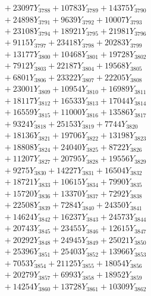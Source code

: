 \documentclass[a4paper,10pt]{article}
\begin{document}
{\begin{align}
&\;  + 23097 Y_{3788} + 10783 Y_{3789} + 14375 Y_{3790} \\[0.3ex]
&\;  + 24898 Y_{3791} + 9639 Y_{3792} + 10007 Y_{3793} \\[0.3ex]
&\;  + 23108 Y_{3794} + 18921 Y_{3795} + 21981 Y_{3796} \\[0.3ex]
&\;  + 9115 Y_{3797} + 23418 Y_{3798} + 20283 Y_{3799} \\[0.3ex]
&\;  + 13177 Y_{3800} + 10468 Y_{3801} + 19728 Y_{3802} \\[0.3ex]
&\;  + 7912 Y_{3803} + 22187 Y_{3804} + 19568 Y_{3805} \\[0.3ex]
&\;  + 6801 Y_{3806} + 23322 Y_{3807} + 22205 Y_{3808} \\[0.5ex]\allowbreak
&\;  + 23001 Y_{3809} + 10954 Y_{3810} + 16989 Y_{3811} \\[0.3ex]
&\;  + 18117 Y_{3812} + 16533 Y_{3813} + 17044 Y_{3814} \\[0.3ex]
&\;  + 16559 Y_{3815} + 11000 Y_{3816} + 13586 Y_{3817} \\[0.3ex]
&\;  + 9324 Y_{3818} + 25153 Y_{3819} + 7744 Y_{3820} \\[0.3ex]
&\;  + 18136 Y_{3821} + 19706 Y_{3822} + 13198 Y_{3823} \\[0.3ex]
&\;  + 18808 Y_{3824} + 24040 Y_{3825} + 8722 Y_{3826} \\[0.3ex]
&\;  + 11207 Y_{3827} + 20795 Y_{3828} + 19556 Y_{3829} \\[0.3ex]
&\;  + 9275 Y_{3830} + 14227 Y_{3831} + 16504 Y_{3832} \\[0.3ex]
&\;  + 18721 Y_{3833} + 10615 Y_{3834} + 7990 Y_{3835} \\[0.3ex]
&\;  + 15720 Y_{3836} + 13370 Y_{3837} + 7292 Y_{3838} \\[0.5ex]\allowbreak
&\;  + 22508 Y_{3839} + 7284 Y_{3840} + 24350 Y_{3841} \\[0.3ex]
&\;  + 14624 Y_{3842} + 16237 Y_{3843} + 24573 Y_{3844} \\[0.3ex]
&\;  + 20743 Y_{3845} + 23455 Y_{3846} + 12615 Y_{3847} \\[0.3ex]
&\;  + 20292 Y_{3848} + 24945 Y_{3849} + 25021 Y_{3850} \\[0.3ex]
&\;  + 25396 Y_{3851} + 25403 Y_{3852} + 13966 Y_{3853} \\[0.3ex]
&\;  + 7053 Y_{3854} + 21125 Y_{3855} + 18054 Y_{3856} \\[0.3ex]
&\;  + 20279 Y_{3857} + 6993 Y_{3858} + 18952 Y_{3859} \\[0.3ex]
&\;  + 14254 Y_{3860} + 13728 Y_{3861} + 10309 Y_{3862} \\[0.3ex]

\end{align}}
\end{document}
